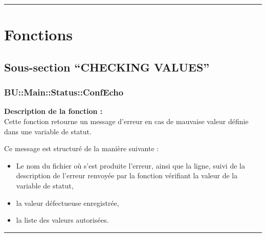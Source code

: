 \documentclass[a4paper,10pt]{article}
\begin{document}

\color{red}\par\noindent\rule{\textwidth}{0.4pt}\color{white}

\color{red}
\section{Fonctions}\color{white}

\color{green}
\subsection{Sous-section ``CHECKING VALUES''}

\color{blue}
\subsubsection{BU::Main::Status::ConfEcho}\color{white}

\begin{justify}
\textbf{Description de la fonction :}\\[1\baselineskip]
    Cette fonction retourne un message d'erreur en cas de mauvaise valeur définie dans une variable de statut.
\end{justify}

\begin{justify}
   	Ce message est structuré de la manière suivante :

   	\begin{itemize}
   		\item Le nom du fichier où s'est produite l'erreur, ainsi que la ligne, suivi de la description de l'erreur renvoyée par la fonction vérifiant la valeur de la variable de statut,\setlength{\parskip}{1em}

   		\item la valeur défectueuse enregistrée,

   		\item la liste des valeurs autorisées.
   	\end{itemize}
\end{justify}


\par\noindent\rule{\textwidth}{0.4pt}
\end{document}
